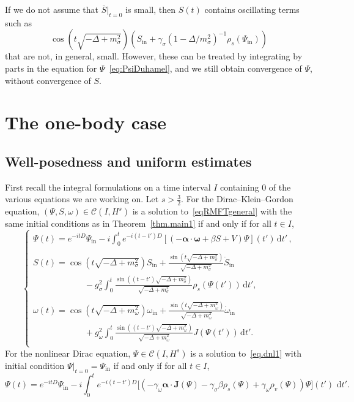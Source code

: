 \documentclass[AHL,Unicode,longabstracts,published]{cedram}
\newcommand{\rmin}{\mathrm{in}}
\newcommand{\cC}{\mathcal{C}}
\renewcommand\d[1]{{\ensuremath{\,\text{d}#1}}}
\newcommand{\dps}{\displaystyle}
\begin{document}
If we do not assume that $\overline{S}\vert_{t=0}$ is small, then $S(t)$ contains oscillating terms such as
\begin{equation}
\cos \left(t\sqrt{-\Delta+m_\sigma^2}\right)\left(S_\rmin+\gamma_\sigma\left(1-\Delta/m_\sigma^2\right)^{-1}\rho_s(\Psi_\rmin)\right)
\end{equation}
that are not, in general, small. However, these can be treated by integrating by parts in the equation for $\Psi$~\eqref{eq:PsiDuhamel}, and we still obtain convergence of $\Psi$, without convergence of $S$.



\section{The one-body case}\label{sect:one-body}

\subsection{Well-posedness and uniform estimates}\label{sect:exist}

First recall the integral formulations on a time interval $I$ containing $0$ of the various equations we are working on. Let $s>\tfrac32$. For the Dirac--Klein--Gordon equation, $(\Psi,S,\omega)\in\cC(I,H^s)$ is a solution to~\eqref{eqRMFTgeneral} with the same initial conditions as in Theorem~\ref{thm.main1} if and only if for all $t\in I$,
\begin{equation}
\begin{cases}\label{eq:dkg-int}
\dps\Psi(t) = e^{-itD}\Psi_\rmin -i\int_0^te^{-i(t-t')D}\left[(-\bm \alpha \cdot \bm \omega +\beta S+V)\Psi\right](t')
\d t'\,,
\\
\\
\dps S(t)=
\cos\left(t\sqrt{-\Delta + m^2_\sigma}\right) S_\rmin + \frac{\sin\left(t\sqrt{-\Delta + m^2_\sigma}\right)}{\sqrt{-\Delta + m^2_\sigma}}\dot{S}_\rmin
\\\dps\qquad\qquad\qquad -g_\sigma^2\int_0^t\frac{\sin\left((t-t')\sqrt{-\Delta + m^2_\sigma}\right)}{\sqrt{-\Delta + m^2_\sigma}}\rho_s(\Psi(t'))\d t',\\
\\
\dps\omega(t)=
\cos\left(t\sqrt{-\Delta + m^2_\omega}\right)\omega_\rmin + \frac{\sin\left(t\sqrt{-\Delta + m^2_\omega}\right)}{\sqrt{-\Delta + m^2_\omega}}\dot{\omega}_\rmin
\\\dps\qquad\qquad\qquad +g_\omega^2\int_0^t\frac{\sin\left((t-t')\sqrt{-\Delta + m^2_\omega}\right)}{\sqrt{-\Delta + m^2_\omega}}J(\Psi(t')) \d t'.\\
\end{cases}
\end{equation}
For the nonlinear Dirac equation, $\Psi\in\cC(I,H^s)$ is a solution to~\eqref{eq.dnl1} with initial condition $\Psi\vert_{t=0}=\Psi_{\rmin}$ if and only if for all $t\in I$,
\begin{equation}\label{eq:dnl-int}
\Psi(t) = e^{-itD}\Psi_\rmin -i\int_0^te^{-i(t-t')D}\big[(-\gamma_\omega\bm \alpha\cdot {\bm J}(\Psi) - \gamma_\sigma\beta\rho_s(\Psi)+\gamma_\omega\rho_v(\Psi))\Psi\big](t')\,\d t'.
\end{equation}
\end{document}
